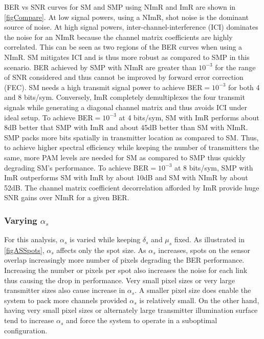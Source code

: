 BER vs SNR curves for SM and SMP using NImR and ImR are shown in \figurename{ \ref{figCompare}}. At low signal powers, using a NImR, shot noise is the dominant source of noise. At high signal powers, inter-channel-interference (ICI) dominates the noise for an NImR because the channel matrix coefficients are highly correlated. This can be seen as two regions of the BER curves when using a NImR. SM mitigates ICI and is thus more robust as compared to SMP in this scenario. BER achieved by SMP with NImR are greater than $10^{-3}$ for the range of SNR considered and thus cannot be improved by forward error correction (FEC). SM needs a high transmit signal power to achieve BER$=10^{-3}$ for both 4 and 8 bits/sym. Conversely, ImR completely demultiplexes the four transmit signals while generating a diagonal channel matrix and thus avoids ICI under ideal setup. To achieve BER$=10^{-3}$ at 4 bits/sym, SM with ImR performs about 8dB better that SMP with ImR and about 45dB better than SM with NImR. SMP packs more bits spatially in transmitter location as compared to SM. Thus, to achieve higher spectral efficiency while keeping the number of transmitters the same, more PAM levels are needed for SM as compared to SMP thus quickly degrading SM's performance. To achieve BER$=10^{-3}$ at 8 bits/sym, SMP with ImR outperforms SM with ImR by about 10dB and SM with NImR by about 52dB. The channel matrix coefficient decorrelation afforded by ImR provide huge SNR gains over NImR for a given BER.

\newpage

\subsubsection{Varying $\alpha_{s}$}
\label{subsec:osmResultsAlpha}
For this analysis, $\alpha_{s}$ is varied while keeping $\delta_{s}$ and $\mu_{s}$ fixed. As illustrated in \figurename{ \ref{figASSpots}}, $\alpha_{s}$ affects only the spot size. As $\alpha_{s}$ increases, spots on the sensor overlap increasingly more number of pixels degrading the BER performance. Increasing the number or pixels per spot also increases the noise for each link thus causing the drop in performance. Very small pixel sizes or very large transmitter sizes also cause increase in $\alpha_{s}$. A smaller pixel size does enable the system to pack more channels provided $\alpha_{s}$ is relatively small. On the other hand, having very small pixel sizes or alternately large transmitter illumination surface tend to increase $\alpha_{s}$ and force the system to operate in a suboptimal configuration.

